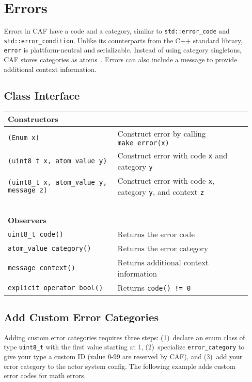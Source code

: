\section{Errors}
\label{error}

Errors in CAF have a code and a category, similar to
\lstinline^std::error_code^ and \lstinline^std::error_condition^. Unlike its
counterparts from the C++ standard library, \lstinline^error^ is
plattform-neutral and serializable. Instead of using category singletons, CAF
stores categories as atoms~. Errors can also include a message to
provide additional context information.

\subsection{Class Interface}

\begin{center}
\begin{tabular}{ll}
  \textbf{Constructors} & ~ \\
  \hline
  \lstinline^(Enum x)^ & Construct error by calling \lstinline^make_error(x)^ \\
  \hline
  \lstinline^(uint8_t x, atom_value y)^ & Construct error with code \lstinline^x^ and category \lstinline^y^ \\
  \hline
  \lstinline^(uint8_t x, atom_value y, message z)^ & Construct error with code \lstinline^x^, category \lstinline^y^, and context \lstinline^z^ \\
  \hline
  ~ & ~ \\ \textbf{Observers} & ~ \\
  \hline
  \lstinline^uint8_t code()^ & Returns the error code \\
  \hline
  \lstinline^atom_value category()^ & Returns the error category \\
  \hline
  \lstinline^message context()^ & Returns additional context information \\
  \hline
  \lstinline^explicit operator bool()^ & Returns \lstinline^code() != 0^ \\
  \hline
\end{tabular}
\end{center}

\subsection{Add Custom Error Categories}
\label{custom-error}

Adding custom error categories requires three steps: (1)~declare an enum class
of type \lstinline^uint8_t^ with the first value starting at 1, (2)~specialize
\lstinline^error_category^ to give your type a custom ID (value 0-99 are
reserved by CAF), and (3)~add your error category to the actor system config.
The following example adds custom error codes for math errors.

